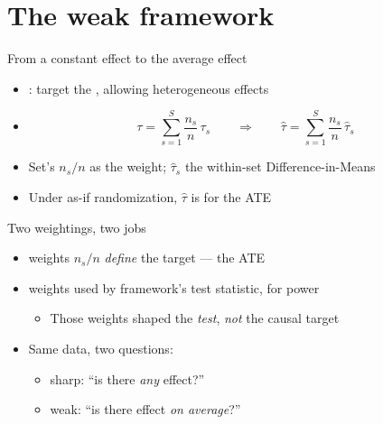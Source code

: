 \documentclass[table, xcolor = {dvipsnames}, 9pt]{beamer}
\theoremstyle{plain}
\newcommand{\mh}[1]{{\color{magenta}{#1}}}
\begin{document}
\section{The weak framework}

\begin{frame}[t]{From a constant effect to the average effect}
\vfill
\begin{itemize} \vfill
\item \mh{Weak framework}: target the \mh{ATE}, allowing heterogeneous effects \vfill
\item[]
\begin{equation*}
\tau = \sum_{s=1}^S \frac{n_s}{n}\, \tau_s
\qquad\Longrightarrow\qquad
\hat{\tau} = \sum_{s=1}^S \frac{n_s}{n}\, \hat{\tau}_s
\end{equation*} \vfill
\item Set's \mh{share} $n_s/n$ as the weight; $\hat{\tau}_s$ the within-set Difference-in-Means \vfill
\item Under as-if randomization, $\hat{\tau}$ is \mh{unbiased} for the ATE \citep{neyman1923} \vfill
\end{itemize} \vfill
\end{frame}
\begin{frame}[t]{Two weightings, two jobs}
\vfill
\begin{itemize} \vfill
\item \mh{Estimand} weights $n_s/n$ \emph{define} the target --- the ATE \vfill
\item \mh{Harmonic-mean} weights used by \mh{sharp} framework's test statistic, for power \vfill
\begin{itemize} \vfill 
\item Those weights shaped the \emph{test}, \emph{not} the causal target \vfill
\end{itemize} \vfill
\item Same data, two questions: \vfill
\begin{itemize} \vfill
\item sharp: ``is there \emph{any} effect?'' \vfill
\item weak: ``is there effect \emph{on average}?'' \vfill
\end{itemize} \vfill
\end{itemize} \vfill
\end{frame}
\end{document}
